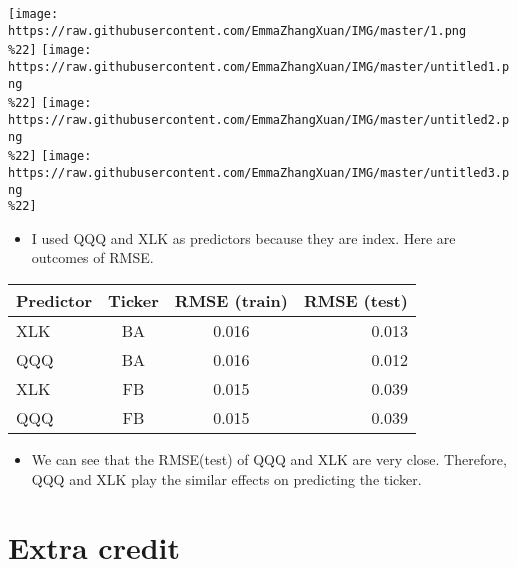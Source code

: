 \documentclass[11pt]{article}
\makeatletter
\def\maxwidth{\ifdim\Gin@nat@width>\linewidth\linewidth
    \else\Gin@nat@width\fi}
\let\Oldincludegraphics\includegraphics
\renewcommand{\includegraphics}[1]{\Oldincludegraphics[width=.8\maxwidth]{#1}}
\providecommand{\tightlist}{%
      \setlength{\itemsep}{0pt}\setlength{\parskip}{0pt}}
\makeatother
\begin{document}
\texttt{[image: https://raw.githubusercontent.com/EmmaZhangXuan/IMG/master/1.png\\\%22]}
\texttt{[image: https://raw.githubusercontent.com/EmmaZhangXuan/IMG/master/untitled1.png\\\%22]}
\texttt{[image: https://raw.githubusercontent.com/EmmaZhangXuan/IMG/master/untitled2.png\\\%22]}
\texttt{[image: https://raw.githubusercontent.com/EmmaZhangXuan/IMG/master/untitled3.png\\\%22]}

    \begin{itemize}
\tightlist
\item
  I used QQQ and XLK as predictors because they are index. Here are
  outcomes of RMSE.
\end{itemize}

\begin{longtable}[]{@{}lccr@{}}
\toprule
Predictor & Ticker & RMSE (train) & RMSE (test)\tabularnewline
\midrule
\endhead
XLK & BA & 0.016 & 0.013\tabularnewline
QQQ & BA & 0.016 & 0.012\tabularnewline
XLK & FB & 0.015 & 0.039\tabularnewline
QQQ & FB & 0.015 & 0.039\tabularnewline
\bottomrule
\end{longtable}

\begin{itemize}
\tightlist
\item
  We can see that the RMSE(test) of QQQ and XLK are very close.
  Therefore, QQQ and XLK play the similar effects on predicting the
  ticker.
\end{itemize}

    \section{\texorpdfstring{{Extra
credit}}{Extra credit}}\label{extra-credit}
\end{document}
